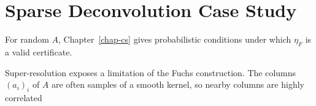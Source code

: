                                        
                                        
                                        
\section{Sparse Deconvolution Case Study}

For random $A$, Chapter~\ref{chap-cs} gives probabilistic conditions under which $\eta_F$ is a valid certificate.

Super-resolution exposes a limitation of the Fuchs construction. The columns $(a_i)_i$ of $A$ are often samples of a smooth kernel, so nearby columns are highly correlated